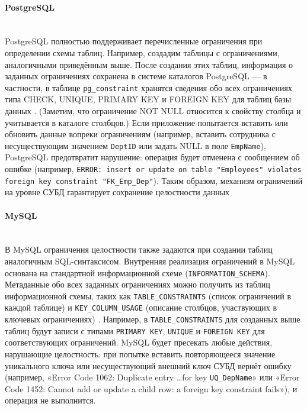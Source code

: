 \paragraph{PostgreSQL} ~\\
 PostgreSQL полностью поддерживает перечисленные ограничения при определении схемы таблиц. Например, создадим таблицы с ограничениями, аналогичными приведённым выше.
 После создания этих таблиц, информация о заданных ограничениях сохранена в системе каталогов PostgreSQL — в частности, в таблице \texttt{pg\_constraint} хранятся сведения обо всех ограничениях типа CHECK, UNIQUE, PRIMARY KEY и FOREIGN KEY для таблиц базы данных \autocite{PostgreSQLdocc51}. (Заметим, что ограничение NOT NULL относится к свойству столбца и учитывается в каталоге столбцов.) Если приложение попытается вставить или обновить данные вопреки ограничениям (например, вставить сотрудника с несуществующим значением \texttt{DeptID} или задать NULL в поле \texttt{EmpName}), PostgreSQL предотвратит нарушение: операция будет отменена с сообщением об ошибке (например, \texttt{ERROR: insert or update on table "Employees" violates foreign key constraint "FK\_Emp\_Dep"}). Таким образом, механизм ограничений на уровне СУБД гарантирует сохранение целостности данных

\paragraph{MySQL} ~\\
 В MySQL ограничения целостности также задаются при создании таблиц аналогичным SQL-синтаксисом.
 Внутренняя реализация ограничений в MySQL основана на стандартной информационной схеме (\texttt{INFORMATION\_SCHEMA}). Метаданные обо всех заданных ограничениях можно получить из таблиц информационной схемы, таких как \texttt{TABLE\_CONSTRAINTS} (список ограничений в каждой таблице) и \texttt{KEY\_COLUMN\_USAGE} (описание столбцов, участвующих в ключевых ограничениях) \autocite{Mysqldoc1}. Например, в \texttt{TABLE\_CONSTRAINTS} для созданных выше таблиц будут записи с типами \texttt{PRIMARY KEY}, \texttt{UNIQUE} и \texttt{FOREIGN KEY} для соответствующих ограничений. MySQL будет пресекать любые действия, нарушающие целостность: при попытке вставить повторяющееся значение уникального ключа или несуществующий внешний ключ СУБД вернёт ошибку (например, «Error Code 1062: Duplicate entry \ldots for key \texttt{UQ\_DepName}» или «Error Code 1452: Cannot add or update a child row: a foreign key constraint fails»), и операция не выполнится. 

